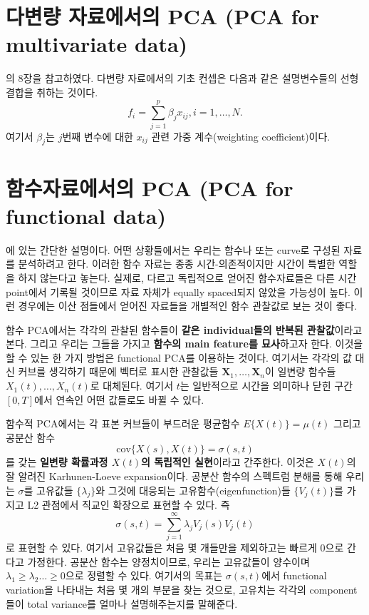 \documentclass[b5paper,]{scrbook}
\theoremstyle{plain}
\theoremstyle{definition}
\numberwithin{equation}{section}
\begin{document}
\hypertarget{--pca-pca-for-multivariate-data}{%
\section{다변량 자료에서의 PCA (PCA for multivariate data)}\label{--pca-pca-for-multivariate-data}}

\citep{Ramsay2005}의 8장을 참고하였다. 다변량 자료에서의 기초 컨셉은 다음과 같은 설명변수들의 선형 결합을 취하는 것이다.
\[f_{i}=\sum_{j=1}^{p}\beta_{j}x_{ij}, i=1,\ldots, N.\]
여기서 \(\beta_{j}\)는 \(j\)번째 변수에 대한 \(x_{ij}\) 관련 가중 계수(weighting coefficient)이다.

\hypertarget{-pca-pca-for-functional-data}{%
\section{함수자료에서의 PCA (PCA for functional data)}\label{-pca-pca-for-functional-data}}

\citep{Izenman2009}에 있는 간단한 설명이다. 어떤 상황들에서는 우리는 함수나 또는 curve로 구성된 자료를 분석하려고 한다. 이러한 함수 자료는 종종 시간-의존적이지만 시간이 특별한 역할을 하지 않는다고 놓는다. 실제로, 다르고 독립적으로 얻어진 함수자료들은 다른 시간 point에서 기록될 것이므로 자료 자체가 equally spaced되지 않았을 가능성이 높다. 이런 경우에는 이산 점들에서 얻어진 자료들을 개별적인 함수 관찰값로 보는 것이 좋다.

함수 PCA에서는 각각의 관찰된 함수들이 \textbf{같은 individual들의 반복된 관찰값}이라고 본다. 그리고 우리는 그들을 가지고 \textbf{함수의 main feature를 묘사}하고자 한다. 이것을 할 수 있는 한 가지 방법은 functional PCA를 이용하는 것이다. 여기서는 각각의 값 대신 커브를 생각하기 때문에 벡터로 표시한 관찰값들 \(\mathbf{X}_{1},\ldots , \mathbf{X}_{n}\)이 일변량 함수들 \(X_{1}(t),\ldots, X_{n}(t)\)로 대체된다. 여기서 \(t\)는 일반적으로 시간을 의미하나 닫힌 구간 \([0,T]\)에서 연속인 어떤 값들로도 바뀔 수 있다.

함수적 PCA에서는 각 표본 커브들이 부드러운 평균함수 \(E\{X(t)\}=\mu(t)\) 그리고 공분산 함수
\[\text{cov}\{X(s),X(t)\}=\sigma(s,t)\]
를 갖는 \textbf{일변량 확률과정 \(X(t)\)의 독립적인 실현}이라고 간주한다. 이것은 \(X(t)\)의 잘 알려진 Karhunen-Loeve expansion이다. 공분산 함수의 스펙트럼 분해를 통해 우리는 \(\sigma\)를 고유값들 \(\{\lambda_{j}\}\)와 그것에 대응되는 고유함수(eigenfunction)들 \(\{V_{j}(t)\}\)를 가지고 L2 관점에서 직교인 확장으로 표현할 수 있다. 즉
\[\sigma(s,t)=\sum_{j=1}^{\infty}\lambda_{j}V_{j}(s)V_{j}(t)\]
로 표현할 수 있다. 여기서 고유값들은 처음 몇 개들만을 제외하고는 빠르게 0으로 간다고 가정한다. 공분산 함수는 양정치이므로, 우리는 고유값들이 양수이며 \(\lambda_{1}\geq \lambda_{2} \ldots \geq 0\)으로 정렬할 수 있다. 여기서의 목표는 \(\sigma(s,t)\)에서 functional variation을 나타내는 처음 몇 개의 부분을 찾는 것으로, 고유치는 각각의 component들이 total variance를 얼마나 설명해주는지를 말해준다.
\end{document}
